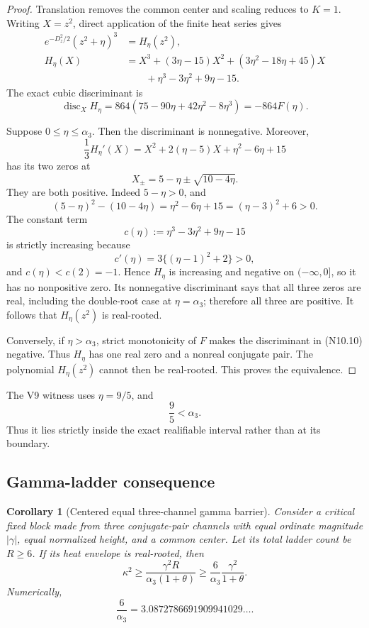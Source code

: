 \documentclass[11pt]{article}
\newtheorem{corollary}[theorem]{Corollary}
\theoremstyle{definition}
\theoremstyle{remark}
\newcommand{\abs}[1]{\left\lvert #1\right\rvert}
\begin{document}
\begin{proof}
Translation removes the common center and scaling reduces to \(K=1\).
Writing \(X=z^2\), direct application of the finite heat series gives
\[
\begin{aligned}
 e^{-D_z^2/2}(z^2+\eta)^3
 &=H_\eta(z^2),\\
 H_\eta(X)
 &=X^3+(3\eta-15)X^2
   +(3\eta^2-18\eta+45)X\\
 &\qquad+\eta^3-3\eta^2+9\eta-15.
\end{aligned}
\tag{N10.9}
\]
The exact cubic discriminant is
\[
 \operatorname{disc}_X H_\eta
 =864(75-90\eta+42\eta^2-8\eta^3)
 =-864F(\eta).
 \tag{N10.10}
\]

Suppose \(0\le\eta\le\alpha_3\).  Then the discriminant is nonnegative.
Moreover,
\[
 \frac13H_\eta'(X)
 =X^2+2(\eta-5)X+\eta^2-6\eta+15
 \tag{N10.11}
\]
has its two zeros at
\[
 X_\pm=5-\eta\pm\sqrt{10-4\eta}.
 \tag{N10.12}
\]
They are both positive.  Indeed \(5-\eta>0\), and
\[
 (5-\eta)^2-(10-4\eta)
 =\eta^2-6\eta+15=(\eta-3)^2+6>0.
 \tag{N10.13}
\]
The constant term
\[
 c(\eta):=\eta^3-3\eta^2+9\eta-15
\]
is strictly increasing because
\[
 c'(\eta)=3\{(\eta-1)^2+2\}>0,
\]
and \(c(\eta)<c(2)=-1\).  Hence \(H_\eta\) is increasing and negative
on \((-\infty,0]\), so it has no nonpositive zero.  Its nonnegative
discriminant says that all three zeros are real, including the double-root
case at \(\eta=\alpha_3\); therefore all three are positive.  It follows
that \(H_\eta(z^2)\) is real-rooted.

Conversely, if \(\eta>\alpha_3\), strict monotonicity of \(F\) makes the
discriminant in \textup{(N10.10)} negative.  Thus \(H_\eta\) has one real
zero and a nonreal conjugate pair.  The polynomial \(H_\eta(z^2)\) cannot
then be real-rooted.  This proves the equivalence.
\end{proof}

The V9 witness uses \(\eta=9/5\), and
\[
 \frac95<\alpha_3.
 \tag{N10.14}
\]
Thus it lies strictly inside the exact realifiable interval rather than at
its boundary.

\subsection{Gamma-ladder consequence}

\begin{corollary}[Centered equal three-channel gamma barrier]
\label{cor:f2v10-gamma}
Consider a critical fixed block made from three conjugate-pair channels
with equal ordinate magnitude \(\abs{\gamma}\), equal normalized height,
and a common center.  Let its total ladder count be \(R\ge6\).  If its heat
envelope is real-rooted, then
\[
 \boxed{
 \kappa^2\ge
 \frac{\gamma^2R}{\alpha_3(1+\theta)}
 \ge
 \frac{6}{\alpha_3}\frac{\gamma^2}{1+\theta}.}
 \tag{N10.15}
\]
Numerically,
\[
 \frac6{\alpha_3}
 =3.0872786691909941029\ldots .
 \tag{N10.16}
\]
\end{corollary}
\end{document}
